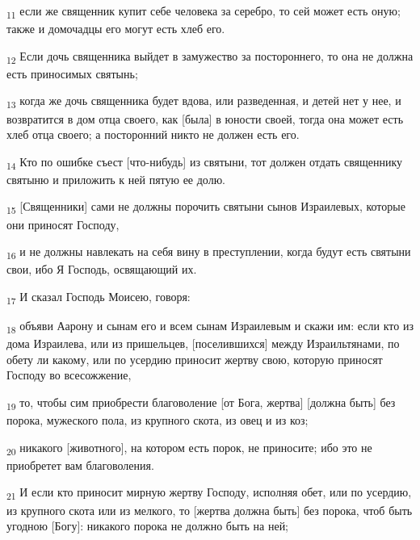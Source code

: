 \begin{tcolorbox}
\textsubscript{11} если же священник купит себе человека за серебро, то сей может есть оную; также и домочадцы его могут есть хлеб его.
\end{tcolorbox}
\begin{tcolorbox}
\textsubscript{12} Если дочь священника выйдет в замужество за постороннего, то она не должна есть приносимых святынь;
\end{tcolorbox}
\begin{tcolorbox}
\textsubscript{13} когда же дочь священника будет вдова, или разведенная, и детей нет у нее, и возвратится в дом отца своего, как [была] в юности своей, тогда она может есть хлеб отца своего; а посторонний никто не должен есть его.
\end{tcolorbox}
\begin{tcolorbox}
\textsubscript{14} Кто по ошибке съест [что-нибудь] из святыни, тот должен отдать священнику святыню и приложить к ней пятую ее долю.
\end{tcolorbox}
\begin{tcolorbox}
\textsubscript{15} [Священники] сами не должны порочить святыни сынов Израилевых, которые они приносят Господу,
\end{tcolorbox}
\begin{tcolorbox}
\textsubscript{16} и не должны навлекать на себя вину в преступлении, когда будут есть святыни свои, ибо Я Господь, освящающий их.
\end{tcolorbox}
\begin{tcolorbox}
\textsubscript{17} И сказал Господь Моисею, говоря:
\end{tcolorbox}
\begin{tcolorbox}
\textsubscript{18} объяви Аарону и сынам его и всем сынам Израилевым и скажи им: если кто из дома Израилева, или из пришельцев, [поселившихся] между Израильтянами, по обету ли какому, или по усердию приносит жертву свою, которую приносят Господу во всесожжение,
\end{tcolorbox}
\begin{tcolorbox}
\textsubscript{19} то, чтобы сим приобрести благоволение [от Бога, жертва] [должна быть] без порока, мужеского пола, из крупного скота, из овец и из коз;
\end{tcolorbox}
\begin{tcolorbox}
\textsubscript{20} никакого [животного], на котором есть порок, не приносите; ибо это не приобретет вам благоволения.
\end{tcolorbox}
\begin{tcolorbox}
\textsubscript{21} И если кто приносит мирную жертву Господу, исполняя обет, или по усердию, из крупного скота или из мелкого, то [жертва должна быть] без порока, чтоб быть угодною [Богу]: никакого порока не должно быть на ней;
\end{tcolorbox}
